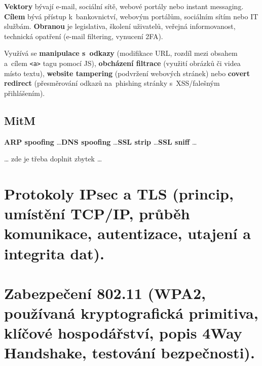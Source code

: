 \textbf{Vektory} bývají e-mail, sociální sítě, webové portály nebo instant messaging. \textbf{Cílem} bývá přístup k~bankovnictví, webovým portálům, sociálním sítím nebo IT službám. \textbf{Obranou} je legislativa, školení uživatelů, veřejná informovanost, technická opatření (e-mail filtering, vynucení 2FA).

Využívá se \textbf{manipulace s~odkazy} (modifikace URL, rozdíl mezi obsahem a~cílem \texttt{<a>} tagu pomocí JS), \textbf{obcházení filtrace} (využití obrázků či videa místo textu), \textbf{website tampering} (podvržení webových stránek) nebo \textbf{covert redirect} (přesměrování odkazů na~phishing stránky s~XSS/falešným přihlášením).

\subsection*{MitM}

\textbf{ARP spoofing} \dots \textbf{DNS spoofing} \dots \textbf{SSL strip} \dots \textbf{SSL sniff} \dots

\begin{center}
{\huge \dots} zde je třeba doplnit zbytek {\huge \dots}
\end{center}

\clearpage
\section{Protokoly IPsec a TLS (princip, umístění TCP/IP, průběh komunikace, autentizace, utajení a integrita dat).}

\clearpage
\section{Zabezpečení 802.11 (WPA2, používaná kryptografická primitiva, klíčové hospodářství, popis 4Way Handshake, testování bezpečnosti).}
